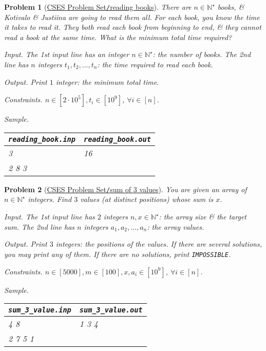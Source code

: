 \documentclass{article}
\newtheorem{problem}{Problem}
\begin{document}
\begin{problem}[\href{https://cses.fi/problemset/task/1631}{CSES Problem Set{\tt/}reading books}]
    There are $n\in\mathbb{N}^\star$ books, \& {\sc Kotivalo \& Justiina} are going to read them all. For each book, you know the time it takes to read it. They both read each book from beginning to end, \& they cannot read a book at the same time. What is the minimum total time required?
    \item {\sf Input.} The 1st input line has an integer $n\in\mathbb{N}^\star$: the number of books. The 2nd line has $n$ integers $t_1,t_2,\ldots,t_n$: the time required to read each book.
    \item {\sf Output.} Print $1$ integer: the minimum total time.
    \item {\sf Constraints.} $n\in[2\cdot10^5],t_i\in[10^9]$, $\forall i\in[n]$.
    \item {\sf Sample.}
    \begin{table}[H]
        \centering
        \begin{tabular}{|l|l|}
            \hline
            \verb|reading_book.inp| & \verb|reading_book.out| \\
            \hline
            3 & 16 \\
            2 8 3 & \\
            \hline
        \end{tabular}
    \end{table}
\end{problem}

\begin{problem}[\href{https://cses.fi/problemset/task/1641}{CSES Problem Set{\tt/}sum of 3 values}]
    You are given an array of $n\in\mathbb{N}^\star$ integers. Find $3$ values (at distinct positions) whose sum is $x$.
    \item {\sf Input.} The 1st input line has $2$ integers $n,x\in\mathbb{N}^\star$: the array size \& the target sum. The 2nd line has $n$ integers $a_1,a_2,\ldots,a_n$: the array values.
    \item {\sf Output.} Print $3$ integers: the positions of the values. If there are several solutions, you may print any of them. If there are no solutions, print {\tt IMPOSSIBLE}.
    \item {\sf Constraints.} $n\in[5000],m\in[100],x,a_i\in[10^9]$, $\forall i\in[n]$.
    \item {\sf Sample.}
    \begin{table}[H]
        \centering
        \begin{tabular}{|l|l|}
            \hline
            \verb|sum_3_value.inp| & \verb|sum_3_value.out| \\
            \hline
            4 8 & 1 3 4 \\
            2 7 5 1 & \\
            \hline
        \end{tabular}
    \end{table}
\end{problem}
\end{document}
